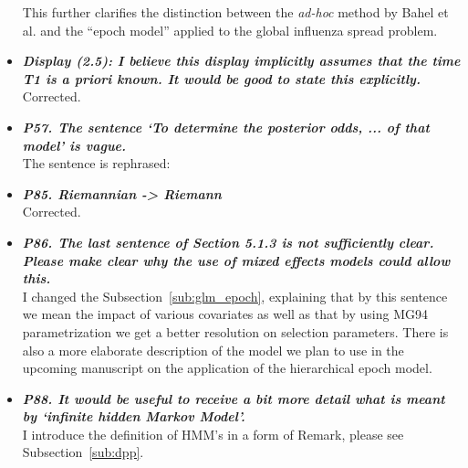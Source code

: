 \documentclass[english]{article}
\begin{document}
\begin{itemize}
\begin{quote}
\myeditsvsixteen
\end{quote}

This further clarifies the distinction between the \emph{ad-hoc} method by Bahel et al. and the ``epoch model'' applied to the global influenza spread problem.

\item {
{\it
\textbf{
Display (2.5): I believe this display implicitly assumes that the time T1 is a priori known. 
It would be good to state this explicitly.
}%
}%
}%
\\
Corrected.


\item {
{\it
\textbf{
P57. The sentence `To determine the posterior odds, ... of that model' is vague.
}%
}%
}%
\\
The sentence is rephrased:

\begin{quote}
\myeditsveighteen
\end{quote}


\item {
{\it
\textbf{
P85. Riemannian -> Riemann
}%
}%
}%
\\
Corrected.


\item {
{\it
\textbf{
P86. The last sentence of Section 5.1.3 is not sufficiently clear. 
Please make clear why the use of mixed effects models could allow this.
}%
}%
}%
\\
I changed the Subsection~\ref{sub:glm_epoch}, explaining that by this sentence we mean the impact of various covariates as well as that by using MG94 parametrization we get a better resolution on selection parameters.
There is also a more elaborate description of the model we plan to use in the upcoming manuscript on the application of the hierarchical epoch model.



\item {
{\it
\textbf{
P88. It would be useful to receive a bit more detail what is meant by `infinite hidden Markov Model'.
}%
}%
}%
\\
I introduce the definition of HMM's in a form of Remark, please see Subsection~\ref{sub:dpp}.



\end{itemize}
\end{document}

